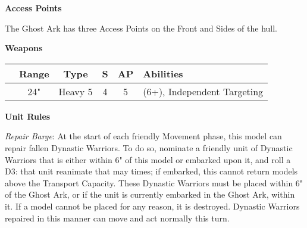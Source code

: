 \begin{minipage}[t]{0.72\textwidth}
	\vspace*{2em}
	\textbf{Access Points}
	
	The Ghost Ark has three Access Points on the Front and Sides of the hull.
	
	\vspace*{2em}
	\textbf{Weapons}
	
	\begin{tabular}{m{95 pt} *{4}{c} >{\raggedright\arraybackslash}p{130pt}}
		& Range & Type & S & AP & Abilities \\
		\hline
		\quickref{Gauss Flayer Array} & 24" & Heavy 5 & 4 & 5 & \quickref{Gauss} (6+), Independent Targeting \\
	\end{tabular}
	
	\vspace*{2em}
	\textbf{Unit Rules}
	
	\textit{Repair Barge}: At the start of each friendly Movement phase, this model can repair fallen Dynastic Warriors. To do so, nominate a friendly unit of Dynastic Warriors that is either within 6" of this model or embarked upon it, and roll a D3: that unit reanimate that may times; if embarked, this cannot return models above the Transport Capacity. These Dynastic Warriors must be placed within 6" of the Ghost Ark, or if the unit is currently embarked in the Ghost Ark, within it. If a model cannot be placed for any reason, it is destroyed. Dynastic Warriors repaired in this manner can move and act normally this turn. 
\end{minipage}



\newpage
